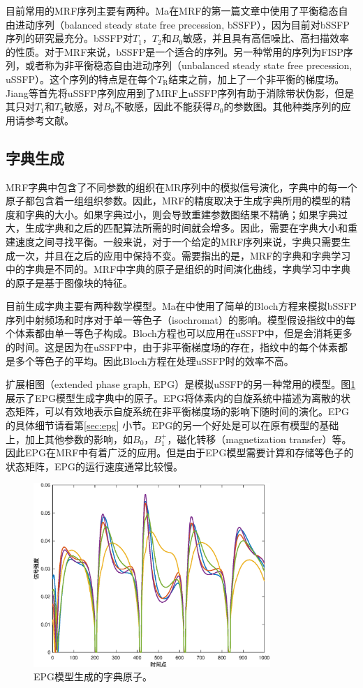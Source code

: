 目前常用的MRF序列主要有两种。Ma\cite{mrf}在MRF的第一篇文章中使用了平衡稳态自由进动序列（balanced steady state free precession, bSSFP\cite{ussfp}），因为目前对bSSFP序列的研究最充分。bSSFP对$T_1$，$T_2$和$B_0$敏感，并且具有高信噪比、高扫描效率的性质。对于MRF来说，bSSFP是一个适合的序列。另一种常用的序列为FISP序列，或者称为非平衡稳态自由进动序列（unbalanced steady state free precession, uSSFP）。这个序列的特点是在每个$T_\mathrm{R}$结束之前，加上了一个非平衡的梯度场。Jiang\cite{jiang}等首先将uSSFP序列应用到了MRF上uSSFP序列有助于消除带状伪影，但是其只对$T_1$和$T_2$敏感，对$B_0$不敏感，因此不能获得$B_0$的参数图。其他种类序列的应用请参考文献\cite{joint,quest}。

\subsection{字典生成}
MRF字典中包含了不同参数的组织在MR序列中的模拟信号演化，字典中的每一个原子都包含着一组组织参数。因此，MRF的精度取决于生成字典所用的模型的精度和字典的大小。如果字典过小，则会导致重建参数图结果不精确；如果字典过大，生成字典和之后的匹配算法所需的时间就会增多。因此，需要在字典大小和重建速度之间寻找平衡。一般来说，对于一个给定的MRF序列来说，字典只需要生成一次，并且在之后的应用中保持不变。需要指出的是，MRF的字典和字典学习中的字典是不同的。MRF中字典的原子是组织的时间演化曲线，字典学习中字典的原子是基于图像块的特征。

目前生成字典主要有两种数学模型。Ma在\cite{mrf}中使用了简单的Bloch方程来模拟bSSFP序列中射频场和时序对于单一等色子（isochromat）的影响。模型假设指纹中的每个体素都由单一等色子构成。Bloch方程也可以应用在uSSFP中，但是会消耗更多的时间。这是因为在uSSFP中，由于非平衡梯度场的存在，指纹中的每个体素都是多个等色子的平均。因此Bloch方程在处理uSSFP时的效率不高。

扩展相图（extended phase graph, EPG\cite{weigel}）是模拟uSSFP的另一种常用的模型。图\ref{fig:atoms}展示了EPG模型生成字典中的原子。EPG将体素内的自旋系统中描述为离散的状态矩阵，可以有效地表示自旋系统在非平衡梯度场的影响下随时间的演化。EPG的具体细节请看第\ref{sec:epg} 小节。EPG的另一个好处是可以在原有模型的基础上，加上其他参数的影响，如$B_0$，$B_1^+$，磁化转移（magnetization transfer）等。因此EPG在MRF中有着广泛的应用。但是由于EPG模型需要计算和存储等色子的状态矩阵，EPG的运行速度通常比较慢。
\begin{figure}[htbp]
\centering
\includegraphics[width=0.8\textwidth]{img/intro/atoms.eps}
\caption{EPG模型生成的字典原子。}
\label{fig:atoms}
\end{figure}

